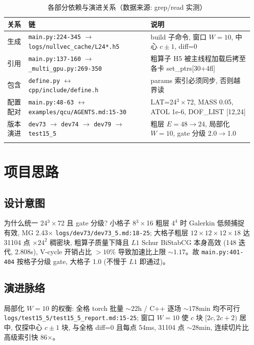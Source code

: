 \documentclass[UTF8]{ctexart}
\begin{document}
\begin{xltabular}{\textwidth}{llX}
\toprule
关系 & 链 & 说明 \\
\midrule
\endhead
生成 & \texttt{\nolinkurl{main.py:224-345}} $\to$ \texttt{\nolinkurl{logs/nullvec_cache/L24*.h5}} & build 子命令, 窗口 $W=10$, 中心 $c\pm1$, diff=0 \\
引用 & \texttt{\nolinkurl{main.py:137-160}} $\to$ \texttt{\nolinkurl{_multi_gpu.py:269-350}} & 粗算子 H5 被主线程加载后拷至各卡 set\_ptrs[30+4fl] \\
包含 & \texttt{\nolinkurl{define.py}} $\leftrightarrow$ \texttt{\nolinkurl{cpp/include/define.h}} & params 索引必须同步, 否则越界读 \\
配置配对 & \texttt{\nolinkurl{main.py:48-63}} $\leftrightarrow$ \texttt{\nolinkurl{examples/qcu/AGENTS.md:15-30}} & LAT=24$^3\times$72, MASS 0.05, ATOL 1e-6, DOF\_LIST [12,24] \\
版本演进 & \texttt{\nolinkurl{dev73}} $\to$ \texttt{\nolinkurl{dev74}} $\to$ \texttt{\nolinkurl{dev79}} $\to$ \texttt{\nolinkurl{test15_5}} & 粗层 $E=48\to24$, 局部化 $W=10$, gate 分级 2.0$\to$1.0 \\
\bottomrule
\caption{各部分依赖与演进关系（数据来源: grep/read 实测）}
\end{xltabular}

\section{项目思路}
\subsection{设计意图}
\textcolor{idea}{为什么统一 24$^3\times$72 且 gate 分级?} 小格子 8$^3\times$16 粗层 $4^4$ 时 Galerkin 低频捕捉有效, MG 2.43$\times$ \textcolor{evidence}{\texttt{\nolinkurl{logs/dev73/dev73_5.md:18-25}}}; 大格子粗层 $12\times12\times12\times18$ 达 31104 点 $\times 24^2$ 稠密块, 粗算子质量下降且 $L1$ Schur BiStabCG 本身高效 (148 迭代, 2.808s), V-cycle 开销占比 $>10\%$ 导致加速比上限 $\sim1.17$。故 \texttt{\nolinkurl{main.py:401-404}} 按格子分级 gate, 大格子 1.0 (不慢于 $L1$ 即通过)。

\subsection{演进脉络}
\textcolor{idea}{局部化 $W=10$ 的权衡:} 全格 torch 批量 $\sim22$h / C++ 逐场 $\sim178$min 均不可行 \textcolor{evidence}{\texttt{\nolinkurl{logs/test15_5/test15_5_report.md:15-25}}}; 窗口 $W=10$ 使 $c$ 块 $[2c,2c+2)$ 居中, 仅探中心 $c\pm1$ 块, 与全格 diff=0 且每点 54ms, 31104 点 $\sim28$min, 连续切片比高级索引快 86$\times$。
\end{document}
